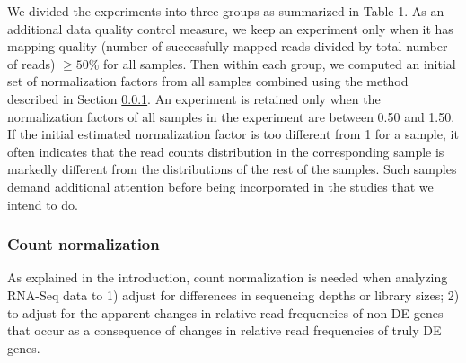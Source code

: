 

We divided the experiments into three groups as summarized in Table 1.  As an
additional data quality control measure,  we keep an experiment only when it 
has mapping quality (number of successfully mapped reads divided by total number of reads) $\geq 
50\%$ for all samples.
Then within each group, we computed an
initial set of normalization factors from all samples combined using the method
described in Section \ref{section:countNormalization}.  An experiment is
retained only when the normalization factors of all samples in the experiment
are between 0.50 and 1.50.  If the initial estimated normalization factor is
too different from 1 for a sample, it often indicates that the read counts
distribution in the corresponding sample is markedly different from the
distributions of the rest of the samples. Such samples demand additional
attention before being incorporated in the studies that we intend to do.



\subsubsection{Count normalization}\label{section:countNormalization}
As explained in the introduction, count normalization is needed when analyzing RNA-Seq data to
1) adjust for differences in sequencing depths or
library sizes; 2) to adjust for the apparent changes in relative read
frequencies of non-DE genes that occur as a consequence of changes in relative read frequencies of 
truly DE genes.

